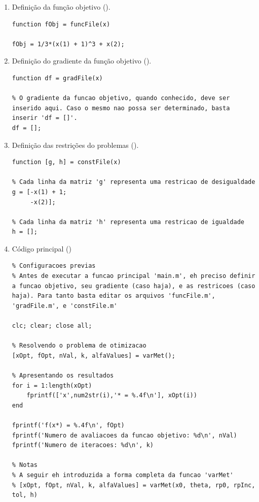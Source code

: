 \documentclass[12pt]{article}
\begin{document}
 		\begin{enumerate}
 			\item Definição da função objetivo ().
 			\begin{lstlisting}
function fObj = funcFile(x)

fObj = 1/3*(x(1) + 1)^3 + x(2);
 			\end{lstlisting}
 				
 			\item Definição do gradiente da função objetivo ().
 			\begin{lstlisting}
function df = gradFile(x)

% O gradiente da funcao objetivo, quando conhecido, deve ser inserido aqui. Caso o mesmo nao possa ser determinado, basta inserir 'df = []'.
df = [];
 			\end{lstlisting}
 			
 			\item Definição das restrições do problemas ().
 			\begin{lstlisting}
function [g, h] = constFile(x)

% Cada linha da matriz 'g' representa uma restricao de desigualdade
g = [-x(1) + 1;
     -x(2)];

% Cada linha da matriz 'h' representa uma restricao de igualdade
h = [];
 			\end{lstlisting}
 			
 			\item Código principal ()
 			\begin{lstlisting}
% Configuracoes previas 
% Antes de executar a funcao principal 'main.m', eh preciso definir a funcao objetivo, seu gradiente (caso haja), e as restricoes (caso haja). Para tanto basta editar os arquivos 'funcFile.m', 'gradFile.m', e 'constFile.m'

clc; clear; close all;

% Resolvendo o problema de otimizacao
[xOpt, fOpt, nVal, k, alfaValues] = varMet();

% Apresentando os resultados 
for i = 1:length(xOpt)
	fprintf(['x',num2str(i),'* = %.4f\n'], xOpt(i))
end

fprintf('f(x*) = %.4f\n', fOpt)
fprintf('Numero de avaliacoes da funcao objetivo: %d\n', nVal)
fprintf('Numero de iteracoes: %d\n', k)

% Notas 
% A seguir eh introduzida a forma completa da funcao 'varMet'
% [xOpt, fOpt, nVal, k, alfaValues] = varMet(x0, theta, rp0, rpInc, tol, h)


\end{lstlisting}
\end{enumerate}
\end{document}
